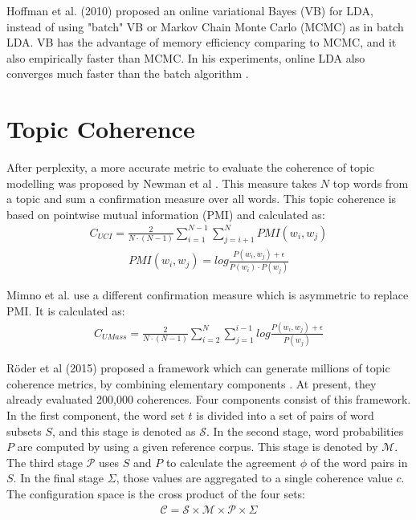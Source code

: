 \documentclass{article} %
\begin{document}
Hoffman et al. (2010) proposed an online variational Bayes (VB) for LDA, instead of using "batch" VB or Markov Chain Monte Carlo (MCMC) as in batch LDA. VB has the advantage of memory efficiency comparing to MCMC, and it also empirically faster than MCMC. In his experiments, online LDA also converges much faster than the batch algorithm \cite{hoffman_online_2010}. 

\section{Topic Coherence}
After perplexity, a more accurate metric to evaluate the coherence of topic modelling was proposed by Newman et al \cite{newman_automatic_nodate}. This measure takes $N$ top words from a topic and sum a confirmation measure over all words. This topic coherence is based on pointwise mutual information (PMI) and calculated as:
\begin{align}
      C_{UCI} = \frac{2}{N\cdot (N-1)} \sum_{i=1}^{N-1} \sum_{j=i+1}^{N} PMI(w_i, w_j)
\end{align}
\begin{align}
      PMI(w_i, w_j)=log \frac{P(w_i, w_j) + \epsilon}{P(w_i)\cdot P(w_j)}
\end{align}

Mimno et al. use a different confirmation measure which is asymmetric to replace PMI. It is calculated as:
\begin{align}
      C_{UMass} = \frac{2}{N\cdot (N-1)} \sum_{i=2}^{N} \sum_{j=1}^{i-1} log \frac{P(w_i, w_j) + \epsilon}{P(w_j)}
\end{align}

Röder et al (2015) proposed a framework which can generate millions of topic coherence metrics, by combining elementary components \cite{roder_exploring_2015}. At present, they already evaluated 200,000 coherences. Four components consist of this framework. In the first component, the word set $t$ is divided into a set of pairs of word subsets $S$, and this stage is denoted as $\mathcal{S}$. In the second stage, word probabilities $P$ are computed by using a given reference corpus. This stage is denoted by $\mathcal{M}$. The third stage $\mathcal{P}$ uses $S$ and $P$ to calculate the agreement $\phi$ of the word pairs in $S$. In the final stage $\Sigma$, those values are aggregated to a single coherence value $c$. The configuration space is the cross product of the four sets:
\begin{align}
      \mathcal{C = S \times M \times P \times } \Sigma 
\end{align}
\end{document}
